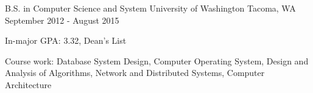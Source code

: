 


\begin{cventries}


\cventry
{B.S. in Computer Science and System } %
{University of Washington} %
{Tacoma, WA} %
{September 2012 - August 2015} %
{ %
\begin{cvitems}
\item {In-major GPA: 3.32, Dean's List}
\item {Course work: Database System Design, Computer Operating System, Design and Analysis of Algorithms, Network and Distributed Systems, Computer Architecture}
\end{cvitems}
}


\end{cventries}